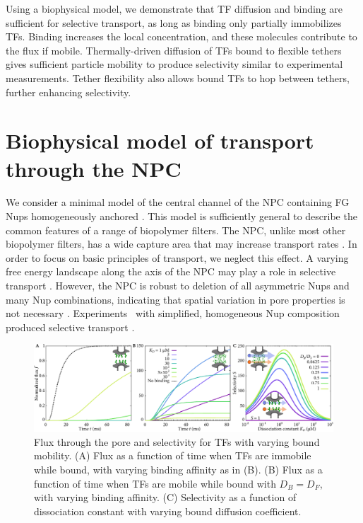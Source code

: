 Using a biophysical model, we demonstrate that TF diffusion and
binding are sufficient for selective transport, as long as binding
only partially immobilizes TFs. Binding increases the local
concentration, and these molecules contribute to the flux if mobile.
Thermally-driven diffusion of TFs bound to flexible tethers gives
sufficient particle mobility to produce selectivity similar to
experimental measurements.  Tether flexibility also allows bound TFs
to hop between tethers, further enhancing selectivity.

\section*{Biophysical model of transport through the NPC}

We consider a minimal model of the central channel of the NPC
containing FG Nups homogeneously anchored .  This
model is sufficiently general to describe the common features of a
range of biopolymer filters.  The NPC, unlike most other biopolymer
filters, has a wide capture area that may increase transport rates
\cite{pagliara14}.  In order to focus on basic principles of
transport, we neglect this effect.  A varying free energy landscape
along the axis of the NPC may play a role in selective transport
\cite{zilman07, tagliazucchi13, tu13, timney16}.  However, the NPC is
robust to deletion of all asymmetric Nups and many Nup combinations,
indicating that spatial variation in pore properties is not necessary
\cite{strawn04, zeitler04}.  Experiments \vitro\ with simplified,
homogeneous Nup composition produced selective transport
\cite{kowalczyk11, jovanovic-talisman09}.

\begin{figure}[t!]
\centering
\includegraphics[width=\textwidth]{figs/ch02/fig2.pdf}
\caption{Flux through the pore and selectivity for TFs with varying
  bound mobility. (A) Flux as a function of time when TFs are immobile
  while bound, with varying binding affinity as in (B).  (B) Flux as a function
  of time when TFs are mobile while bound with $D_B = D_F$, with
  varying binding affinity.  (C) Selectivity as a function of
  dissociation constant with varying bound diffusion coefficient. }
\label{fig:transient}
\end{figure}

